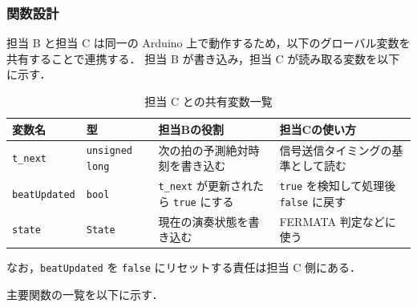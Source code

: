 \documentclass[lualatex,book,paper=a4paper,jafontsize=11.5pt,jafontscale=1.05,oneside]{jlreq}
\begin{document}
\subsubsection{関数設計}

担当 B と担当 C は同一の Arduino 上で動作するため，以下のグローバル変数を共有することで連携する．
担当 B が書き込み，担当 C が読み取る変数を以下に示す．

\begin{table}[H]
\centering
\caption{担当 C との共有変数一覧}
\begin{tabular}{p{3.5cm}p{2.5cm}p{4cm}p{4cm}}
\hline
\textbf{変数名} & \textbf{型} & \textbf{担当Bの役割} & \textbf{担当Cの使い方} \\
\hline
\hline
\texttt{t\_next} & \texttt{unsigned long} &
次の拍の予測絶対時刻を書き込む & 信号送信タイミングの基準として読む \\
\hline
\texttt{beatUpdated} & \texttt{bool} &
\texttt{t\_next} が更新されたら \texttt{true} にする &
\texttt{true} を検知して処理後 \texttt{false} に戻す \\
\hline
\texttt{state} & \texttt{State} &
現在の演奏状態を書き込む &
FERMATA 判定などに使う \\
\hline
\end{tabular}
\end{table}

なお，\texttt{beatUpdated} を \texttt{false} にリセットする責任は担当 C 側にある．

主要関数の一覧を以下に示す．
\end{document}
